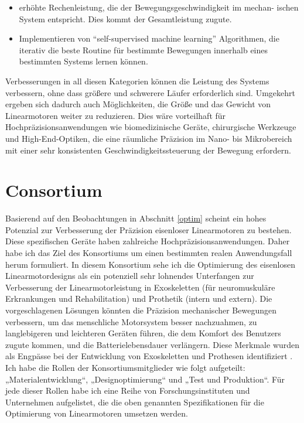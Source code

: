 \documentclass[
  oneside]{book}
\providecommand{\tightlist}{%
  \setlength{\itemsep}{0pt}\setlength{\parskip}{0pt}}
\begin{document}
\begin{itemize}
\tightlist
\item
  erhöhte Rechenleistung, die der Bewegungsgeschwindigkeit im mechan- ischen System entspricht. Dies kommt der Gesamtleistung zugute.
\item
  Implementieren von ``self-supervised machine learning'' Algorithmen, die iterativ die beste Routine für bestimmte Bewegungen innerhalb eines bestimmten Systems lernen können.
\end{itemize}

Verbesserungen in all diesen Kategorien können die Leistung des Systems verbessern, ohne dass größere und schwerere Läufer erforderlich sind. Umgekehrt ergeben sich dadurch auch Möglichkeiten, die Größe und das Gewicht von Linearmotoren weiter zu reduzieren. Dies wäre vorteilhaft für Hochpräzisionsanwendungen wie biomedizinische Geräte, chirurgische Werkzeuge und High-End-Optiken, die eine räumliche Präzision im Nano- bis Mikrobereich mit einer sehr konsistenten Geschwindigkeitssteuerung der Bewegung erfordern.

\hypertarget{consortium}{%
\section{Consortium}\label{consortium}}

Basierend auf den Beobachtungen in Abschnitt \ref{optim} scheint ein hohes Potenzial zur Verbesserung der Präzision eisenloser Linearmotoren zu bestehen. Diese spezifischen Geräte haben zahlreiche Hochpräzisionsanwendungen. Daher habe ich das Ziel des Konsortiums um einen bestimmten realen Anwendungsfall herum formuliert. In diesem Konsortium sehe ich die Optimierung des eisenlosen Linearmotordesigns als ein potenziell sehr lohnendes Unterfangen zur Verbesserung der Linearmotorleistung in Exoskeletten (für neuromuskuläre Erkrankungen und Rehabilitation) und Prothetik (intern und extern). Die vorgeschlagenen Lösungen könnten die Präzision mechanischer Bewegungen verbessern, um das menschliche Motorsystem besser nachzuahmen, zu langlebigeren und leichteren Geräten führen, die dem Komfort des Benutzers zugute kommen, und die Batterielebensdauer verlängern. Diese Merkmale wurden als Engpässe bei der Entwicklung von Exoskeletten und Prothesen identifiziert \citep{pasquina2015}. Ich habe die Rollen der Konsortiumsmitglieder wie folgt aufgeteilt: „Materialentwicklung``, „Designoptimierung`` und „Test und Produktion``. Für jede dieser Rollen habe ich eine Reihe von Forschungsinstituten und Unternehmen aufgelistet, die die oben genannten Spezifikationen für die Optimierung von Linearmotoren umsetzen werden.
\end{document}
